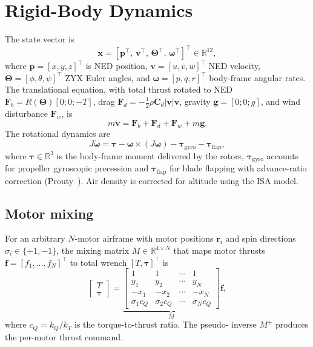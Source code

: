\documentclass[a4paper, conference]{IEEEtran}
\begin{document}
\section{Rigid-Body Dynamics}\label{sec:dyn}
The state vector is
\begin{equation}
\mathbf{x} = [\mathbf{p}^{\!\top}\!,\, \mathbf{v}^{\!\top}\!,\,
\boldsymbol{\Theta}^{\!\top}\!,\, \boldsymbol{\omega}^{\!\top}]^{\!\top}
\in \mathbb{R}^{12},
\end{equation}
where $\mathbf{p}=[x,y,z]^{\!\top}$ is NED position,
$\mathbf{v}=[u,v,w]^{\!\top}$ NED velocity,
$\boldsymbol{\Theta}=[\phi,\theta,\psi]^{\!\top}$ ZYX Euler angles,
and $\boldsymbol{\omega}=[p,q,r]^{\!\top}$ body-frame angular rates.
The translational equation, with total thrust rotated to NED
$\mathbf{F}_b = R(\boldsymbol{\Theta})[0;0;-T]$, drag
$\mathbf{F}_d = -\tfrac{1}{2}\rho \mathbf{C}_d |\mathbf{v}|\mathbf{v}$,
gravity $\mathbf{g}=[0;0;g]$, and wind disturbance
$\mathbf{F}_w$, is
\begin{equation}
m \dot{\mathbf{v}} = \mathbf{F}_b + \mathbf{F}_d + \mathbf{F}_w + m\mathbf{g}.
\end{equation}
The rotational dynamics are
\begin{equation}
J\dot{\boldsymbol{\omega}} = \boldsymbol{\tau} -
\boldsymbol{\omega}\times(J\boldsymbol{\omega}) -
\boldsymbol{\tau}_{\mathrm{gyro}} - \boldsymbol{\tau}_{\mathrm{flap}},
\end{equation}
where $\boldsymbol{\tau}\in\mathbb{R}^3$ is the body-frame moment
delivered by the rotors, $\boldsymbol{\tau}_{\mathrm{gyro}}$ accounts
for propeller gyroscopic precession and
$\boldsymbol{\tau}_{\mathrm{flap}}$ for blade flapping with
advance-ratio correction (Prouty~\cite{prouty,leishman}). Air density is corrected for
altitude using the ISA model.

\subsection{Motor mixing}
For an arbitrary $N$-motor airframe with motor positions
$\mathbf{r}_i$ and spin directions $\sigma_i\in\{+1,-1\}$, the
mixing matrix $M\in\mathbb{R}^{4\times N}$ that maps motor thrusts
$\mathbf{f}=[f_1,\dots,f_N]^{\!\top}$ to total wrench
$[T,\boldsymbol{\tau}]^{\!\top}$ is
\begin{equation}
\begin{bmatrix}T \\ \boldsymbol{\tau}\end{bmatrix} =
\underbrace{\begin{bmatrix}
1 & 1 & \cdots & 1 \\
y_1 & y_2 & \cdots & y_N \\
-x_1 & -x_2 & \cdots & -x_N \\
\sigma_1 c_Q & \sigma_2 c_Q & \cdots & \sigma_N c_Q
\end{bmatrix}}_{M} \mathbf{f},
\end{equation}
where $c_Q=k_Q/k_T$ is the torque-to-thrust ratio. The pseudo-
inverse $M^{+}$ produces the per-motor thrust command.
\end{document}
